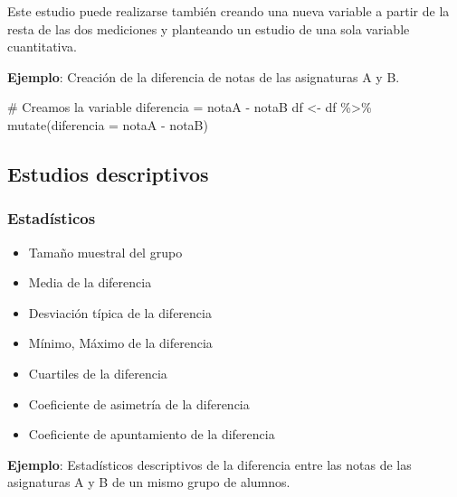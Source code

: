 \documentclass[
  a4paper,
]{scrreport}
\newenvironment{Shaded}{\begin{snugshade}}{\end{snugshade}}
\newcommand{\AttributeTok}[1]{\textcolor[rgb]{0.40,0.45,0.13}{#1}}
\newcommand{\CommentTok}[1]{\textcolor[rgb]{0.37,0.37,0.37}{#1}}
\newcommand{\FunctionTok}[1]{\textcolor[rgb]{0.28,0.35,0.67}{#1}}
\newcommand{\NormalTok}[1]{\textcolor[rgb]{0.00,0.23,0.31}{#1}}
\newcommand{\OtherTok}[1]{\textcolor[rgb]{0.00,0.23,0.31}{#1}}
\newcommand{\SpecialCharTok}[1]{\textcolor[rgb]{0.37,0.37,0.37}{#1}}
\providecommand{\tightlist}{%
  \setlength{\itemsep}{0pt}\setlength{\parskip}{0pt}}\usepackage{longtable,booktabs,array}
\theoremstyle{definition}
\theoremstyle{definition}
\theoremstyle{remark}
\begin{document}
Este estudio puede realizarse también creando una nueva variable a
partir de la resta de las dos mediciones y planteando un estudio de una
sola variable cuantitativa.

\textbf{Ejemplo}: Creación de la diferencia de notas de las asignaturas
A y B.

\begin{Shaded}
\begin{Highlighting}[]
\CommentTok{\# Creamos la variable diferencia = notaA {-} notaB}
\NormalTok{df }\OtherTok{\textless{}{-}}\NormalTok{ df }\SpecialCharTok{\%\textgreater{}\%} \FunctionTok{mutate}\NormalTok{(}\AttributeTok{diferencia =}\NormalTok{ notaA }\SpecialCharTok{{-}}\NormalTok{ notaB)}
\end{Highlighting}
\end{Shaded}

\subsection{Estudios descriptivos}\label{estudios-descriptivos-3}

\subsubsection{Estadísticos}\label{estaduxedsticos-3}

\begin{itemize}
\tightlist
\item
  Tamaño muestral del grupo
\item
  Media de la diferencia
\item
  Desviación típica de la diferencia
\item
  Mínimo, Máximo de la diferencia
\item
  Cuartiles de la diferencia
\item
  Coeficiente de asimetría de la diferencia
\item
  Coeficiente de apuntamiento de la diferencia
\end{itemize}

\textbf{Ejemplo}: Estadísticos descriptivos de la diferencia entre las
notas de las asignaturas A y B de un mismo grupo de alumnos.

\begin{Shaded}
\end{Shaded}
\end{document}
